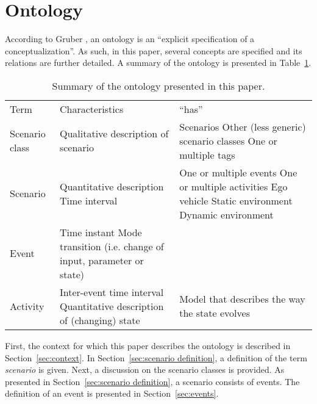 \section{Ontology}
\label{sec:ontology}

According to Gruber \cite{gruber1993ontology}, an ontology is an ``explicit specification of a conceptualization''. As such, in this paper, several concepts are specified and its relations are further detailed. A summary of the ontology is presented in Table~\ref{tab:ontology}.

\begin{table}
	\begin{center}
		\caption{Summary of the ontology presented in this paper.}
		\label{tab:ontology}
		\begin{tabularx}{\linewidth}{p{3em} X X}
			\toprule
			Term & Characteristics & ``has'' \\ \otoprule
			Scenario class & Qualitative description of scenario & Scenarios \newline Other (less generic) scenario classes \newline One or multiple tags \\
			Scenario & Quantitative description \newline Time interval & One or multiple events \newline One or multiple activities \newline Ego vehicle \newline Static environment \newline Dynamic environment \\
			Event & Time instant \newline Mode transition (i.e. change of input, parameter or state) & \\
			Activity & Inter-event time interval \newline Quantitative description of (changing) state & Model that describes the way the state evolves \\
			\bottomrule
		\end{tabularx}
	\end{center}
\end{table}

First, the context for which this paper describes the ontology is described in Section~\ref{sec:context}. In Section~\ref{sec:scenario definition}, a definition of the term \emph{scenario} is given. Next, a discussion on the scenario classes is provided. As presented in Section~\ref{sec:scenario definition}, a scenario consists of events. The definition of an event is presented in Section~\ref{sec:events}.






